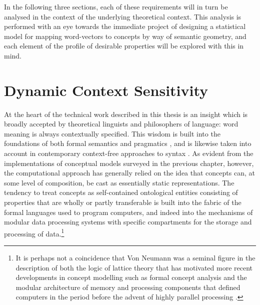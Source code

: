 In the following three sections, each of these requirements will in turn be analysed in the context of the underlying theoretical context.  This analysis is performed with an eye towards the immediate project of designing a statistical model for mapping word-vectors to concepts by way of semantic geometry, and each element of the profile of desirable properties will be explored with this in mind.

\section{Dynamic Context Sensitivity}
At the heart of the technical work described in this thesis is an insight which is broadly accepted by theoretical linguists and philosophers of language: word meaning is always contextually specified.  This wisdom is built into the foundations of both formal semantics \citep{Montague1974} and pragmatics \citep{Grice1975}, and is likewise taken into account in contemporary context-free approaches to syntax \cite{Chomsky1986}.  As evident from the implementations of conceptual models surveyed in the previous chapter, however, the computational approach has generally relied on the idea that concepts can, at some level of composition, be cast as essentially static representations.  The tendency to treat concepts as self-contained ontological entities consisting of properties that are wholly or partly transferable is built into the fabric of the formal languages used to program computers, and indeed into the mechanisms of modular data processing systems with specific compartments for the storage and processing of data.\footnote{It is perhaps not a coincidence that Von Neumann was a seminal figure in the description of both the logic of lattice theory \citep{Birkhoff1958} that has motivated more recent developments in concept modelling such as formal concept analysis \citep{Wille1982} and the modular architecture of memory and processing components that defined computers in the period before the advent of highly parallel processing \citep{VonNeumann1945}.

}
